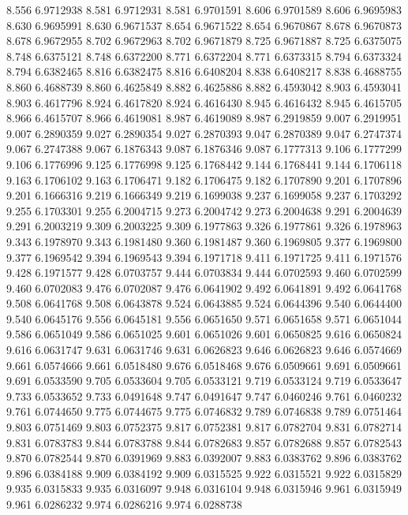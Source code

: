 8.556 6.9712938
8.581 6.9712931
8.581 6.9701591
8.606 6.9701589
8.606 6.9695983
8.630 6.9695991
8.630 6.9671537
8.654 6.9671522
8.654 6.9670867
8.678 6.9670873
8.678 6.9672955
8.702 6.9672963
8.702 6.9671879
8.725 6.9671887
8.725 6.6375075
8.748 6.6375121
8.748 6.6372200
8.771 6.6372204
8.771 6.6373315
8.794 6.6373324
8.794 6.6382465
8.816 6.6382475
8.816 6.6408204
8.838 6.6408217
8.838 6.4688755
8.860 6.4688739
8.860 6.4625849
8.882 6.4625886
8.882 6.4593042
8.903 6.4593041
8.903 6.4617796
8.924 6.4617820
8.924 6.4616430
8.945 6.4616432
8.945 6.4615705
8.966 6.4615707
8.966 6.4619081
8.987 6.4619089
8.987 6.2919859
9.007 6.2919951
9.007 6.2890359
9.027 6.2890354
9.027 6.2870393
9.047 6.2870389
9.047 6.2747374
9.067 6.2747388
9.067 6.1876343
9.087 6.1876346
9.087 6.1777313
9.106 6.1777299
9.106 6.1776996
9.125 6.1776998
9.125 6.1768442
9.144 6.1768441
9.144 6.1706118
9.163 6.1706102
9.163 6.1706471
9.182 6.1706475
9.182 6.1707890
9.201 6.1707896
9.201 6.1666316
9.219 6.1666349
9.219 6.1699038
9.237 6.1699058
9.237 6.1703292
9.255 6.1703301
9.255 6.2004715
9.273 6.2004742
9.273 6.2004638
9.291 6.2004639
9.291 6.2003219
9.309 6.2003225
9.309 6.1977863
9.326 6.1977861
9.326 6.1978963
9.343 6.1978970
9.343 6.1981480
9.360 6.1981487
9.360 6.1969805
9.377 6.1969800
9.377 6.1969542
9.394 6.1969543
9.394 6.1971718
9.411 6.1971725
9.411 6.1971576
9.428 6.1971577
9.428 6.0703757
9.444 6.0703834
9.444 6.0702593
9.460 6.0702599
9.460 6.0702083
9.476 6.0702087
9.476 6.0641902
9.492 6.0641891
9.492 6.0641768
9.508 6.0641768
9.508 6.0643878
9.524 6.0643885
9.524 6.0644396
9.540 6.0644400
9.540 6.0645176
9.556 6.0645181
9.556 6.0651650
9.571 6.0651658
9.571 6.0651044
9.586 6.0651049
9.586 6.0651025
9.601 6.0651026
9.601 6.0650825
9.616 6.0650824
9.616 6.0631747
9.631 6.0631746
9.631 6.0626823
9.646 6.0626823
9.646 6.0574669
9.661 6.0574666
9.661 6.0518480
9.676 6.0518468
9.676 6.0509661
9.691 6.0509661
9.691 6.0533590
9.705 6.0533604
9.705 6.0533121
9.719 6.0533124
9.719 6.0533647
9.733 6.0533652
9.733 6.0491648
9.747 6.0491647
9.747 6.0460246
9.761 6.0460232
9.761 6.0744650
9.775 6.0744675
9.775 6.0746832
9.789 6.0746838
9.789 6.0751464
9.803 6.0751469
9.803 6.0752375
9.817 6.0752381
9.817 6.0782704
9.831 6.0782714
9.831 6.0783783
9.844 6.0783788
9.844 6.0782683
9.857 6.0782688
9.857 6.0782543
9.870 6.0782544
9.870 6.0391969
9.883 6.0392007
9.883 6.0383762
9.896 6.0383762
9.896 6.0384188
9.909 6.0384192
9.909 6.0315525
9.922 6.0315521
9.922 6.0315829
9.935 6.0315833
9.935 6.0316097
9.948 6.0316104
9.948 6.0315946
9.961 6.0315949
9.961 6.0286232
9.974 6.0286216
9.974 6.0288738
